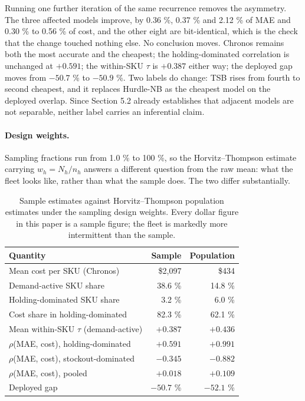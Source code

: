 \documentclass[11pt]{article}
\begin{document}
Running one further iteration of the same recurrence removes the asymmetry. The
three affected models improve, by 0.36 \%, 0.37 \% and 2.12 \% of MAE and
0.30 \% to 0.56 \% of cost, and the other eight are bit-identical, which is the
check that the change touched nothing else. No conclusion moves. Chronos
remains both the most accurate and the cheapest; the holding-dominated
correlation is unchanged at $+0.591$; the within-SKU $\tau$ is $+0.387$ either
way; the deployed gap moves from $-50.7$ \% to $-50.9$ \%. Two labels do
change: TSB rises from fourth to second cheapest, and it replaces Hurdle-NB as
the cheapest model on the deployed overlap. Since Section 5.2 already
establishes that adjacent models are not separable, neither label carries an
inferential claim.

\paragraph{Design weights.} Sampling fractions run from 1.0 \% to 100 \%, so
the Horvitz--Thompson estimate carrying $w_h = N_h/n_h$ answers a different
question from the raw mean: what the fleet looks like, rather than what the
sample does. The two differ substantially.

\begin{table}[htbp]
\centering
\caption{Sample estimates against Horvitz--Thompson population estimates under
the sampling design weights. Every dollar figure in this paper is a sample
figure; the fleet is markedly more intermittent than the sample.}
\label{tab:weights}
\small
\begin{tabular}{lrr}
\toprule
Quantity & Sample & Population \\
\midrule
Mean cost per SKU (Chronos) & \$2{,}097 & \$434 \\
Demand-active SKU share & 38.6 \% & 14.8 \% \\
Holding-dominated SKU share & 3.2 \% & 6.0 \% \\
Cost share in holding-dominated & 82.3 \% & 62.1 \% \\
Mean within-SKU $\tau$ (demand-active) & $+0.387$ & $+0.436$ \\
$\rho$(MAE, cost), holding-dominated & $+0.591$ & $\mathbf{+0.991}$ \\
$\rho$(MAE, cost), stockout-dominated & $-0.345$ & $\mathbf{-0.882}$ \\
$\rho$(MAE, cost), pooled & $+0.018$ & $+0.109$ \\
Deployed gap & $-50.7$ \% & $-52.1$ \% \\
\bottomrule
\end{tabular}
\end{table}
\end{document}
